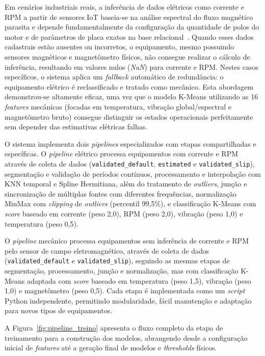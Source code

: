 Em cenários industriais reais, a inferência de dados elétricos como corrente e RPM a partir de sensores IoT baseia-se na análise espectral do fluxo magnético parasita e depende fundamentalmente da configuração da quantidade de polos do motor e de parâmetros de placa exatos na base relacional~\cite{romary2022airgap, doe2014motor, garcia2025estimation}. Quando esses dados cadastrais estão ausentes ou incorretos, o equipamento, mesmo possuindo sensores magnéticos e magnetômetro físicos, não consegue realizar o cálculo de inferência, resultando em valores nulos (\textit{NaN}) para corrente e RPM. Nestes casos específicos, o sistema aplica um \textit{fallback} automático de redundância: o equipamento elétrico é reclassificado e tratado como mecânico. Esta abordagem demonstrou-se altamente eficaz, uma vez que o modelo K-Means utilizando as 16 \textit{features} mecânicas (focadas em temperatura, vibração global/espectral e magnetômetro bruto) consegue distinguir os estados operacionais perfeitamente sem depender das estimativas elétricas falhas.

O sistema implementa dois \textit{pipelines} especializados com etapas compartilhadas e específicas. O \textit{pipeline} elétrico processa equipamentos com corrente e RPM através de coleta de dados (\texttt{validated\_default}, \texttt{estimated} e \texttt{validated\_slip}), segmentação e validação de períodos contínuos, processamento e interpolação com KNN temporal e Spline Hermitiana, além do tratamento de \textit{outliers}, junção e sincronização de múltiplas fontes com diferentes frequências, normalização MinMax com \textit{clipping} de \textit{outliers} (percentil 99,5\%), e classificação K-Means com \textit{score} baseado em corrente (peso 2,0), RPM (peso 2,0), vibração (peso 1,0) e temperatura (peso 0,5).

O \textit{pipeline} mecânico processa equipamentos sem inferência de corrente e RPM pelo sensor de campo eletromagnético, através de coleta de dados (\texttt{validated\_default} e \texttt{validated\_slip}), seguindo as mesmas etapas de segmentação, processamento, junção e normalização, mas com classificação K-Means adaptada com \textit{score} baseado em temperatura (peso 1,5), vibração (peso 1,0) e magnetômetro (peso 0,5). Cada etapa é implementada como um \textit{script} Python independente, permitindo modularidade, fácil manutenção e adaptação para novos tipos de equipamentos.

A Figura~\ref{fig:pipeline_treino} apresenta o fluxo completo da etapa de treinamento para a construção dos modelos, abrangendo desde a configuração inicial de \textit{features} até a geração final de modelos e \textit{thresholds} físicos.

